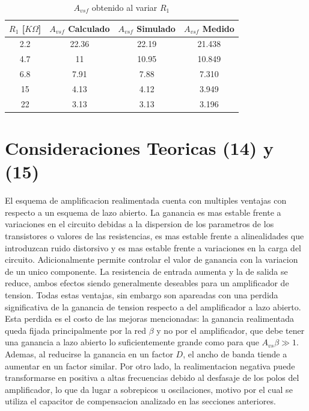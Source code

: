 \documentclass[11pt,a4paper]{article}
\begin{document}
\begin{table}
\centering
\begin{tabular}{ |c|c|c|c| } \hline
\(R_1\) [\(K\Omega\)] & \(A_{vsf}\) Calculado & \(A_{vsf}\) Simulado & \(A_{vsf}\) Medido \\ \hline         
2.2 & 22.36 & 22.19 & 21.438 \\ \hline 
4.7 & 11    & 10.95 & 10.849 \\ \hline 
6.8 & 7.91  & 7.88  & 7.310  \\ \hline 
15  & 4.13  & 4.12  & 3.949  \\ \hline 
22  & 3.13  & 3.13  & 3.196  \\ \hline 
\end{tabular}
\caption { \(A_{vsf}\) obtenido al variar \(R_1\)}
\label{tab:R1} 
\end{table}

\newpage
\section{Consideraciones Teoricas (14) y (15)}
El esquema de amplificacion realimentada cuenta con multiples ventajas con respecto a un esquema de lazo abierto. La ganancia es mas estable frente a variaciones en el circuito debidas a la dispersion de los parametros de los transistores o valores de las resistencias, es mas estable frente a alinealidades que introduzcan ruido distorsivo y es mas estable frente a variaciones en la carga del circuito. Adicionalmente permite controlar el valor de ganancia con la variacion de un unico componente. La resistencia de entrada aumenta y la de salida se reduce, ambos efectos siendo generalmente deseables para un amplificador de tension. Todas estas ventajas, sin embargo son apareadas con una perdida significativa de la ganancia de tension respecto a del amplificador a lazo abierto. Esta perdida es el costo de las mejoras mencionadas: la ganancia realimentada queda fijada principalmente por la red \(\beta\) y no por el amplificador, que debe tener una ganancia a lazo abierto lo suficientemente grande como para que \(A_{vs}\beta \gg 1\). Ademas, al reducirse la ganancia en un factor \(D\), el ancho de banda tiende a aumentar en un factor similar. Por otro lado, la realimentacion negativa puede transformarse en positiva a altas frecuencias debido al desfasaje de los polos del amplificador, lo que da lugar a sobrepicos u oscilaciones, motivo por el cual se utiliza el capacitor de compensacion analizado en las secciones anteriores.
\end{document}
